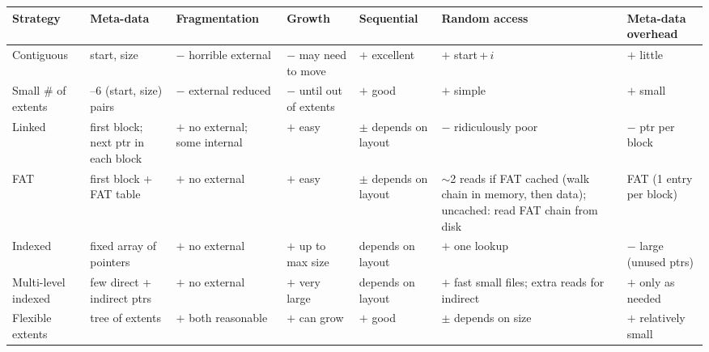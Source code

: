 \documentclass[11pt,a4paper]{article}
\begin{document}
\begin{center}
\footnotesize
\setlength{\tabcolsep}{3pt}
\renewcommand{\arraystretch}{1.25}
\begin{tabularx}{\textwidth}{@{}>{\raggedright\arraybackslash}p{1.75cm}
    >{\raggedright\arraybackslash}X >{\raggedright\arraybackslash}X
    >{\raggedright\arraybackslash}X >{\raggedright\arraybackslash}X
    >{\raggedright\arraybackslash}X >{\raggedright\arraybackslash}X@{}}
  \toprule
  \textbf{Strategy} & \textbf{Meta-data} & \textbf{Fragmentation} & \textbf{Growth}
    & \textbf{Sequential} & \textbf{Random access} & \textbf{Meta-data overhead} \\
  \midrule
  Contiguous & start, size & $-$ horrible external & $-$ may need to move
    & $+$ excellent & $+$ start\,+\,\(i\) & $+$ little \\
  Small \# of extents & 2--6 (start, size) pairs & $-$ external reduced
    & $-$ until out of extents & $+$ good & $+$ simple & $+$ small \\
  Linked & first block; next ptr in each block & $+$ no external; some internal
    & $+$ easy & $\pm$ depends on layout & $-$ ridiculously poor & $-$ ptr per block \\
  FAT & first block + FAT table & $+$ no external & $+$ easy
    & $\pm$ depends on layout & $\sim$2 reads if FAT cached (walk chain in memory, then data); uncached: read FAT chain from disk & FAT (1 entry per block) \\
  Indexed & fixed array of pointers & $+$ no external & $+$ up to max size
    & depends on layout & $+$ one lookup & $-$ large (unused ptrs) \\
  Multi-level indexed & few direct + indirect ptrs & $+$ no external & $+$ very large
    & depends on layout & $+$ fast small files; extra reads for indirect & $+$ only as needed \\
  Flexible extents & tree of extents & $+$ both reasonable & $+$ can grow
    & $+$ good & $\pm$ depends on size & $+$ relatively small \\
  \bottomrule
\end{tabularx}
\end{center}
\end{document}
